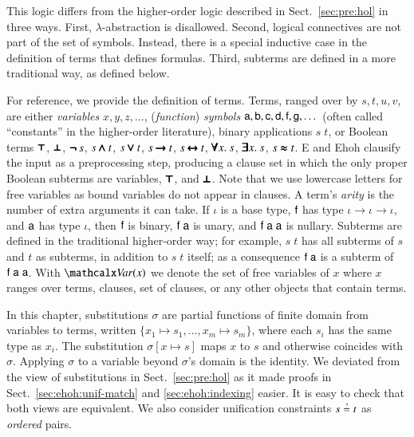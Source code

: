 
This logic differs from the higher-order logic described in
Sect.~\ref{sec:pre:hol} in three ways. First, $\lambda$-abstraction is disallowed.
Second, logical connectives are not part of the set of symbols. Instead, there
is a special inductive case in the definition of terms that defines formulas.
Third, subterms are defined in a more traditional way, as defined below. 

For reference, we provide the definition of terms. Terms, ranged over by $s,t,u,v$, are either
\emph{variables} $x, y, z, \dots$, (\emph{function}) \emph{symbols} $\mathsf{a},
\mathsf{b}, \mathsf{c}, \mathsf{d},\allowbreak \mathsf{f},\allowbreak \mathsf{g}, \ldots{}$
(often called ``constants'' in the higher-order literature), binary applications
$s \; t$, or Boolean terms $\pmb{\top}$, $\pmb{\bot}$, $\pmb{\neg\,} s$, $s \mathbin{\pmb{\land}}
t$, $s \mathbin{\pmb{\lor}} t$, $s \mathbin{\pmb{\rightarrow}} t$, $s \mathbin{\pmb{\leftrightarrow}} t$,
$\pmb{\forall} x.\> s$, $\pmb{\exists} x.\> s$, $s \mathrel{\pmb{\approx}} t$. E and Ehoh clausify
the input as a preprocessing step, producing a clause set in which the only
proper Boolean subterms are variables, $\pmb{\top}$, and $\pmb{\bot}$. Note that we use
lowercase letters for free variables as bound variables do not appear in
clauses. A term's \emph{arity} is the number of extra arguments it can take. If
$\iota$ is a base type, $\mathsf{f}$ has type $\iota \to \iota \to \iota$, and
$\mathsf{a}$ has type $\iota$, then $\mathsf{f}$ is binary, $\mathsf{f}\;\mathsf{a}$ is
unary, and $\mathsf{f}\;\mathsf{a}\;\mathsf{a}$ is nullary. Subterms are defined in the
traditional higher-order way; for example, $s \; t$ has all subterms of $s$ and
$t$ as subterms, in addition to $s \; t$ itself; as a consequence
$\mathsf{f} \; \mathsf{a}$ is a subterm of $\mathsf{f} \; \mathsf{a} \;\mathsf{a}$. With $\Var(x)$
we denote the set of free variables of $x$ where $x$ ranges over terms, clauses,
set of clauses, or any other objects that contain terms.


In this chapter, substitutions $\sigma$ are partial
functions of finite domain from variables to terms, written $\{ x_1 \mapsto s_1,
\ldots, x_m \mapsto s_m \}$, where each $s_i$ has the same type as $x_i$. The
substitution $\sigma[x \mapsto s]$ maps $x$ to $s$ and otherwise coincides with
$\sigma$. Applying $\sigma$ to a variable beyond $\sigma$'s domain is the
identity. We deviated from the view of substitutions in Sect.~\ref{sec:pre:hol}
as it made proofs in Sect.~\ref{sec:ehoh:unif-match} and \ref{sec:ehoh:indexing}
easier. It is easy to check that both views are equivalent. We also consider unification 
constraints $s \unif t$ as \emph{ordered} pairs.

